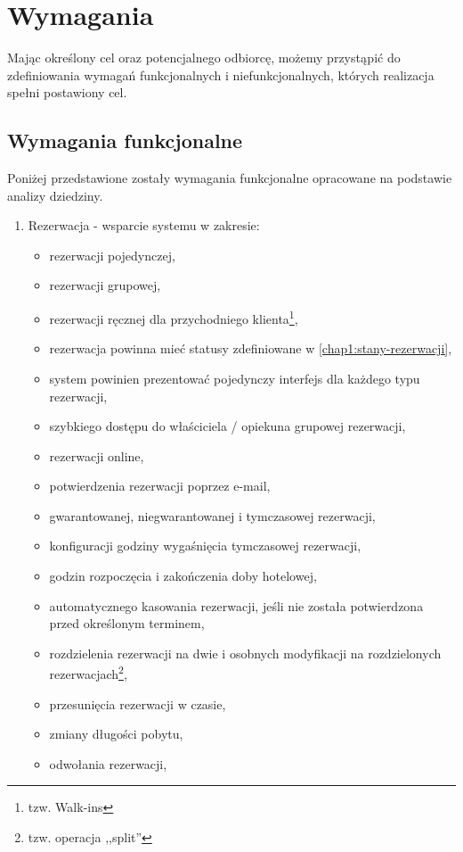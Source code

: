 \documentclass[a4paper,onecolumn,oneside,11pt,wide,floatssmall]{mwrep}
\theoremstyle{definition}
\theoremstyle{plain}%
\theoremstyle{remark}
\begin{document}
\section{Wymagania}
Mając określony cel oraz potencjalnego odbiorcę, możemy przystąpić do zdefiniowania wymagań funkcjonalnych i niefunkcjonalnych, których realizacja spełni postawiony cel.

\subsection{Wymagania funkcjonalne}
\label{wymagania-funkcjonalne}
Poniżej przedstawione zostały wymagania funkcjonalne opracowane na podstawie analizy dziedziny.

\begin{enumerate}
  \item Rezerwacja - wsparcie systemu w zakresie:
    \begin{itemize}
      \item rezerwacji pojedynczej,
      \item rezerwacji grupowej,
      \item rezerwacji ręcznej dla przychodniego klienta\footnote{tzw. Walk-ins},
      \item rezerwacja powinna mieć statusy zdefiniowane w \ref{chap1:stany-rezerwacji},
      \item system powinien prezentować pojedynczy interfejs dla każdego typu rezerwacji,
      \item szybkiego dostępu do właściciela / opiekuna grupowej rezerwacji,
      \item rezerwacji online,
      \item potwierdzenia rezerwacji poprzez e-mail,
      \item gwarantowanej, niegwarantowanej i tymczasowej rezerwacji,
      \item konfiguracji godziny wygaśnięcia tymczasowej rezerwacji,
      \item godzin rozpoczęcia i zakończenia doby hotelowej,
      \item automatycznego kasowania rezerwacji, jeśli nie została potwierdzona przed określonym terminem,
      \item rozdzielenia rezerwacji na dwie i osobnych modyfikacji na rozdzielonych rezerwacjach\footnote{tzw. operacja ,,split''},
      \item przesunięcia rezerwacji w czasie,
      \item zmiany długości pobytu,
      \item odwołania rezerwacji,

\end{itemize}
\end{enumerate}
\end{document}
